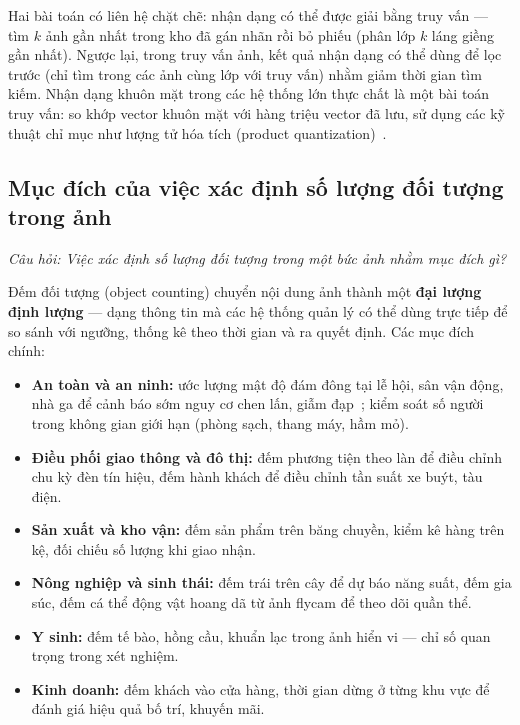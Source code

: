 Hai bài toán có liên hệ chặt chẽ: nhận dạng có thể được giải bằng truy vấn — tìm $k$ ảnh gần nhất trong kho đã gán nhãn rồi bỏ phiếu (phân lớp $k$ láng giềng gần nhất). Ngược lại, trong truy vấn ảnh, kết quả nhận dạng có thể dùng để lọc trước (chỉ tìm trong các ảnh cùng lớp với truy vấn) nhằm giảm thời gian tìm kiếm. Nhận dạng khuôn mặt trong các hệ thống lớn thực chất là một bài toán truy vấn: so khớp vector khuôn mặt với hàng triệu vector đã lưu, sử dụng các kỹ thuật chỉ mục như lượng tử hóa tích (product quantization)~\citep{jegou2011product}.

\subsection{Mục đích của việc xác định số lượng đối tượng trong ảnh}
\label{subsec:w2_counting}

\textit{Câu hỏi: Việc xác định số lượng đối tượng trong một bức ảnh nhằm mục đích gì?}

Đếm đối tượng (object counting) chuyển nội dung ảnh thành một \textbf{đại lượng định lượng} — dạng thông tin mà các hệ thống quản lý có thể dùng trực tiếp để so sánh với ngưỡng, thống kê theo thời gian và ra quyết định. Các mục đích chính:

\begin{itemize}
    \item \textbf{An toàn và an ninh:} ước lượng mật độ đám đông tại lễ hội, sân vận động, nhà ga để cảnh báo sớm nguy cơ chen lấn, giẫm đạp~\citep{li2018csrnet}; kiểm soát số người trong không gian giới hạn (phòng sạch, thang máy, hầm mỏ).
    \item \textbf{Điều phối giao thông và đô thị:} đếm phương tiện theo làn để điều chỉnh chu kỳ đèn tín hiệu, đếm hành khách để điều chỉnh tần suất xe buýt, tàu điện.
    \item \textbf{Sản xuất và kho vận:} đếm sản phẩm trên băng chuyền, kiểm kê hàng trên kệ, đối chiếu số lượng khi giao nhận.
    \item \textbf{Nông nghiệp và sinh thái:} đếm trái trên cây để dự báo năng suất, đếm gia súc, đếm cá thể động vật hoang dã từ ảnh flycam để theo dõi quần thể.
    \item \textbf{Y sinh:} đếm tế bào, hồng cầu, khuẩn lạc trong ảnh hiển vi — chỉ số quan trọng trong xét nghiệm.
    \item \textbf{Kinh doanh:} đếm khách vào cửa hàng, thời gian dừng ở từng khu vực để đánh giá hiệu quả bố trí, khuyến mãi.
\end{itemize}


